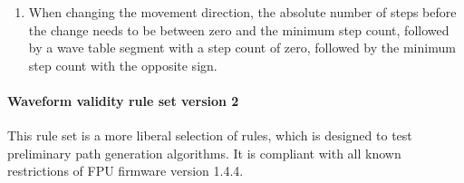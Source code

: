 \documentclass[11pt,a4paper]{report}
\begin{document}
\begin{enumerate}
\item When changing the movement direction, the absolute number of
  steps before the change needs to be between zero and the minimum
  step count, followed by a wave table segment with a step count of
  zero, followed by the minimum step count with the opposite sign.
  
  
\end{enumerate}

\paragraph{Waveform validity rule set version 2}

This rule set is a more liberal selection of rules, which is designed
to test preliminary path generation algorithms. It is compliant with
all known restrictions of FPU firmware version 1.4.4.
\end{document}
